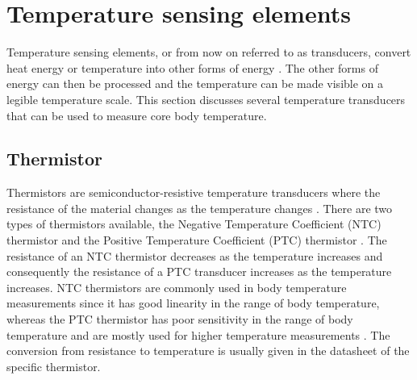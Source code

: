 \section{Temperature sensing elements}
Temperature sensing elements, or from now on referred to as transducers, convert heat energy or temperature into other forms of energy \cite{Chen2019}. The other forms of energy can then be processed and the temperature can be made visible on a legible temperature scale. This section discusses several temperature transducers that can be used to measure core body temperature. 

\subsection{Thermistor}
Thermistors are semiconductor-resistive temperature transducers where the resistance of the material changes as the temperature changes \cite{Gums2018}. There are two types of thermistors available, the Negative Temperature Coefficient (NTC) thermistor and the Positive Temperature Coefficient (PTC) thermistor \cite{Borwankar2015}. The resistance of an NTC thermistor decreases as the temperature increases and consequently the resistance of a PTC transducer increases as the temperature increases. NTC thermistors are commonly used in body temperature measurements since it has good linearity in the range of body temperature, whereas the PTC thermistor has poor sensitivity in the range of body temperature and are mostly used for higher temperature measurements \cite{Chen2019}. The conversion from resistance to temperature is usually given in the datasheet of the specific thermistor. 

